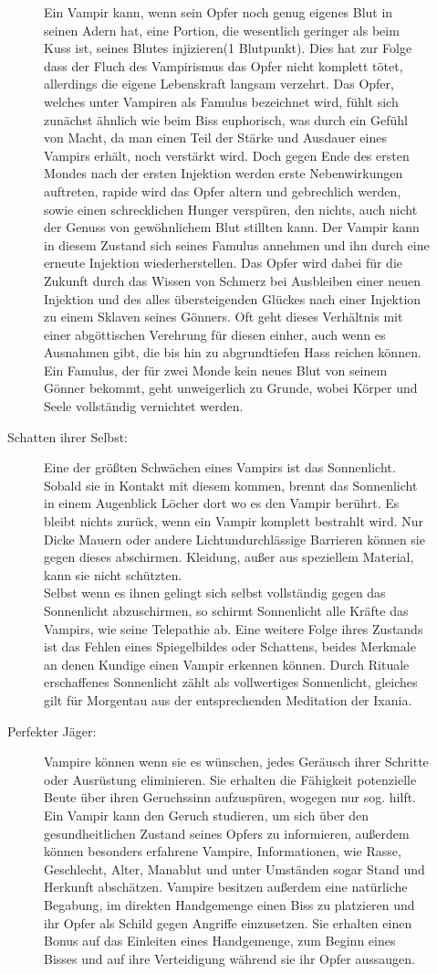 \documentclass[a4paper,12pt,oneside]{book}
\begin{document}
\begin{description}
\begin{description}
Ein Vampir kann, wenn sein Opfer noch genug eigenes Blut in seinen Adern hat, eine Portion, die wesentlich geringer als beim Kuss ist, seines Blutes injizieren(1 Blutpunkt). Dies hat zur Folge dass der Fluch des Vampirismus das Opfer nicht komplett tötet, allerdings die eigene Lebenskraft langsam verzehrt. Das Opfer, welches unter Vampiren als Famulus bezeichnet wird, fühlt sich zunächst ähnlich wie beim Biss euphorisch, was durch ein Gefühl von Macht, da man einen Teil der Stärke und Ausdauer eines Vampirs erhält, noch verstärkt wird. Doch gegen Ende des ersten Mondes nach der ersten Injektion werden erste Nebenwirkungen auftreten, rapide wird das Opfer altern und gebrechlich werden, sowie einen schrecklichen Hunger verspüren, den nichts, auch nicht der Genuss von gewöhnlichem Blut stillten kann. Der Vampir kann in diesem Zustand sich seines Famulus annehmen und ihn durch eine erneute Injektion wiederherstellen. Das Opfer wird dabei für die Zukunft durch das Wissen von Schmerz bei Ausbleiben einer neuen Injektion und des alles übersteigenden Glückes nach einer Injektion zu einem Sklaven seines Gönners. Oft geht dieses Verhältnis mit einer abgöttischen Verehrung für diesen einher, auch wenn es Ausnahmen gibt, die bis hin zu abgrundtiefen Hass reichen können. Ein Famulus, der für zwei Monde kein neues Blut von seinem Gönner bekommt, geht unweigerlich zu Grunde, wobei Körper und Seele vollständig vernichtet werden.
\item[Schatten ihrer Selbst:]
Eine der größten Schwächen eines Vampirs ist das Sonnenlicht. Sobald sie in Kontakt mit diesem kommen, brennt das Sonnenlicht in einem Augenblick Löcher dort wo es den Vampir berührt. Es bleibt nichts zurück, wenn ein Vampir komplett bestrahlt wird. Nur Dicke Mauern oder andere Lichtundurchlässige Barrieren können sie gegen dieses abschirmen. Kleidung, außer aus speziellem Material, kann sie nicht schützten.
\\Selbst wenn es ihnen gelingt sich selbst vollständig gegen das Sonnenlicht abzuschirmen, so schirmt Sonnenlicht alle Kräfte das Vampirs, wie seine Telepathie ab. Eine weitere Folge ihres Zustands ist das Fehlen eines Spiegelbildes oder Schattens, beides Merkmale an denen Kundige einen Vampir erkennen können. Durch Rituale erschaffenes Sonnenlicht zählt als vollwertiges Sonnenlicht, gleiches gilt für Morgentau aus der entsprechenden Meditation der Ixania.
\item[Perfekter Jäger:]
Vampire können wenn sie es wünschen, jedes Geräusch ihrer Schritte oder Ausrüstung eliminieren. Sie erhalten die Fähigkeit potenzielle Beute über ihren Geruchssinn aufzuspüren, wogegen nur sog. \uline{} hilft. Ein Vampir kann den Geruch studieren, um sich über den gesundheitlichen Zustand seines Opfers zu informieren, außerdem können besonders erfahrene Vampire, Informationen, wie Rasse, Geschlecht, Alter, Manablut und unter Umständen sogar Stand und Herkunft abschätzen. Vampire besitzen außerdem eine natürliche Begabung, im direkten Handgemenge einen Biss zu platzieren und ihr Opfer als Schild gegen Angriffe einzusetzen. Sie erhalten einen Bonus auf das Einleiten eines Handgemenge, zum Beginn eines Bisses und auf ihre Verteidigung während sie ihr Opfer aussaugen.

\end{description}
\end{description}
\end{document}
